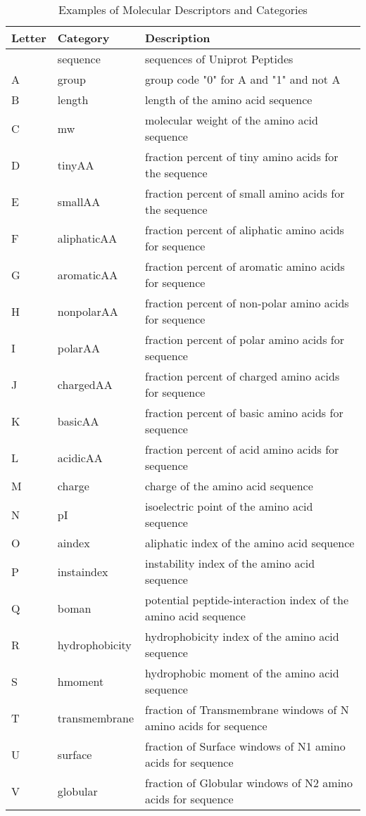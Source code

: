 \begin{table}[H]\tiny
 \caption{Examples of Molecular Descriptors and Categories }
\begin{tabular}{p{1cm}p{1cm}p{6cm}}
		\hline	
Letter & Category & Description \\
\hline
& sequence & sequences of Uniprot Peptides \\
A & group  & group code "0" for A and "1" and not A \\
B & length & length of the amino acid sequence \\
C & mw & molecular weight of the amino acid sequence \\
D & tinyAA & fraction percent of tiny amino acids for the sequence \\
E & smallAA & fraction percent of small amino acids for the sequence \\
F & aliphaticAA & fraction percent of aliphatic amino acids for sequence \\
G & aromaticAA & fraction percent of aromatic amino acids for sequence \\
H & nonpolarAA & fraction percent of non-polar amino acids for sequence \\
I & polarAA & fraction percent of polar amino acids for sequence \\
J & chargedAA & fraction percent of charged amino acids for sequence \\
K & basicAA & fraction percent of basic amino acids for sequence \\
L & acidicAA & fraction percent of acid amino acids for sequence \\
M & charge & charge of the amino acid sequence \\
N & pI & isoelectric point of the amino acid sequence \\
O & aindex & aliphatic index of the amino acid sequence \\
P & instaindex & instability index of the amino acid sequence \\
Q & boman & potential peptide-interaction index of the amino acid sequence \\
R & hydrophobicity & hydrophobicity index of the amino acid sequence \\
S & hmoment & hydrophobic moment of the amino acid sequence \\
T & transmembrane & fraction of Transmembrane windows of N amino acids for sequence \\
U & surface & fraction of Surface windows of N1 amino acids for sequence \\
V & globular & fraction of Globular windows of N2 amino acids for sequence \\
  \hline
\end{tabular}
\end{table}

